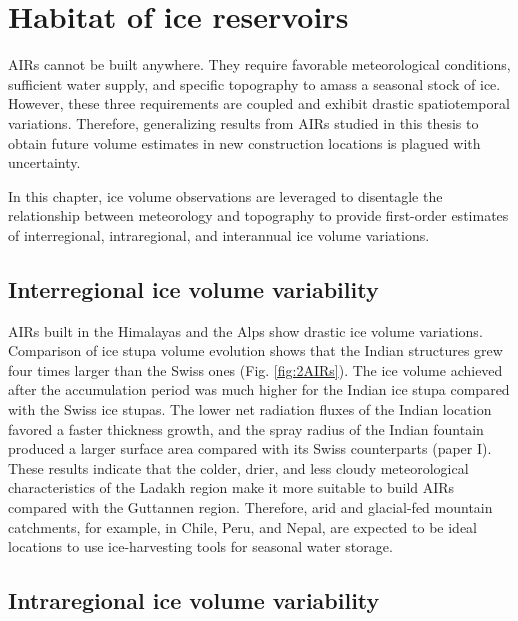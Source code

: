 \chapter{Habitat of ice reservoirs}


\ac{AIRs} cannot be built anywhere. They require favorable meteorological conditions, sufficient water supply,
and specific topography to amass a seasonal stock of ice. However, these three requirements are coupled and
exhibit drastic spatiotemporal variations. Therefore, generalizing results from AIRs studied in this thesis to
obtain future volume estimates in new construction locations is plagued with uncertainty.

In this chapter, ice volume observations are leveraged to disentagle the relationship between meteorology
and topography to provide first-order estimates of interregional, intraregional, and interannual ice volume
variations. 

\section{Interregional ice volume variability}

\ac{AIRs} built in the Himalayas and the Alps show drastic ice volume variations. Comparison of ice stupa volume
evolution shows that the Indian structures grew four times larger than the Swiss ones (Fig. \ref{fig:2AIRs}). The
ice volume achieved after the accumulation period was much higher for the Indian ice stupa compared with the Swiss
ice stupas. The lower net radiation fluxes of the Indian location favored a faster thickness growth, and the
spray radius of the Indian fountain produced a larger surface area compared with its Swiss counterparts (paper I).
These results indicate that the colder, drier, and less cloudy meteorological characteristics of the Ladakh
region make it more suitable to build \ac{AIRs} compared with the Guttannen region. Therefore, arid and
glacial-fed mountain catchments, for example, in Chile, Peru, and Nepal, are expected to be ideal locations to use
ice-harvesting tools for seasonal water storage.

\section{Intraregional ice volume variability}

